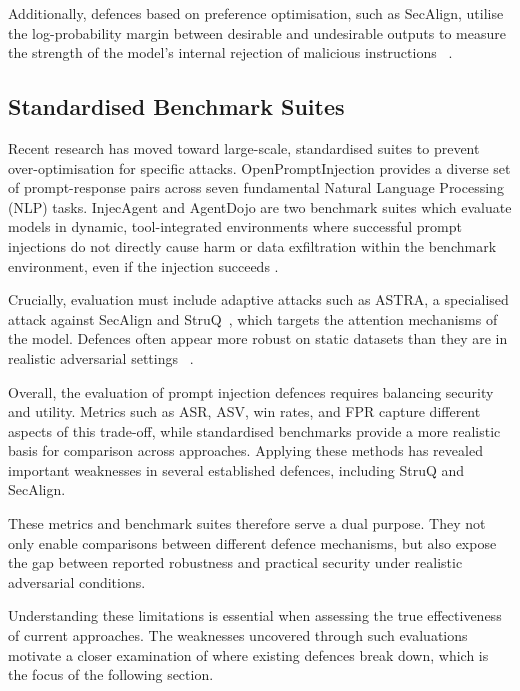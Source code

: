 Additionally, defences based on preference optimisation, such as SecAlign,
utilise the log-probability margin between desirable and undesirable outputs to
measure the strength of the model's internal rejection of malicious instructions
~\parencite{chen2025secalign}.

\subsection{Standardised Benchmark Suites}

Recent research has moved toward large-scale, standardised suites to prevent
over-optimisation for specific attacks. OpenPromptInjection provides a diverse
set of prompt-response pairs across seven fundamental Natural Language
Processing (NLP) tasks. InjecAgent and AgentDojo are two benchmark suites which evaluate models in dynamic, tool-integrated environments where successful prompt injections do not directly cause harm or data exfiltration within the benchmark environment, even if the injection succeeds \parencites{wu2024systemlevel}{zhong2025rtbas}.

Crucially, evaluation must include adaptive attacks such as ASTRA, a specialised
attack against SecAlign and StruQ~\parencite{pandya2025astra}, which targets
the attention mechanisms of the model. Defences often appear more robust on
static datasets than they are in realistic adversarial settings
~\parencite{jia2025critical}.

Overall, the evaluation of prompt injection defences requires balancing
security and utility. Metrics such as ASR, ASV, win rates, and FPR capture
different aspects of this trade-off, while standardised benchmarks provide a
more realistic basis for comparison across approaches. Applying these methods
has revealed important weaknesses in several established defences, including
StruQ and SecAlign.

These metrics and benchmark suites therefore serve a dual purpose. They not
only enable comparisons between different defence mechanisms, but also expose
the gap between reported robustness and practical security under realistic
adversarial conditions.

Understanding these limitations is essential when assessing the true
effectiveness of current approaches. The weaknesses uncovered through such
evaluations motivate a closer examination of where existing defences break
down, which is the focus of the following section.


